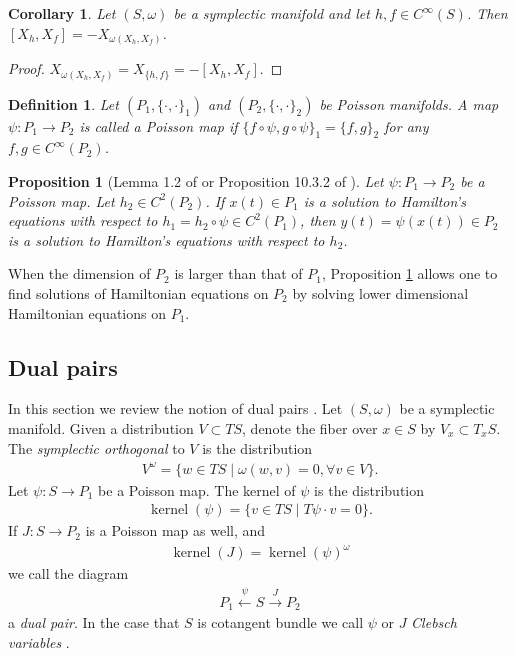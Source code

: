 \documentclass[12pt]{amsart}
\newtheorem{prop}[thm]{Proposition}
\newtheorem{cor}[thm]{Corollary}
\newtheorem{defn}[thm]{Definition}
\DeclareMathOperator{\kernel}{kernel}
\begin{document}
\begin{cor} \label{cor:Lie_hom}
  Let $(S,\omega)$ be a symplectic manifold
  and let $h,f \in C^{\infty}(S)$.
  Then $[X_h , X_f] = -X_{\omega(X_h,X_f) }$.
\end{cor}
\begin{proof}
  $X_{\omega(X_h,X_f)} = X_{ \{h,f\} } = -[X_h , X_f]$.
\end{proof}

\begin{defn}
  Let $(P_1, \{ \cdot , \cdot \}_1)$ and $(P_2, \{ \cdot , \cdot \}_2)$
  be Poisson manifolds.
  A map $\psi:P_1 \to P_2$ is called a
  \emph{Poisson map} if $\{ f \circ \psi , g \circ \psi \}_1 = \{ f , g \}_2$  for any $f,g \in C^{\infty}(P_2)$.
\end{defn}


\begin{prop}[Lemma 1.2 of \cite{Weinstein1983} or Proposition 10.3.2 of \cite{MandS}] \label{prop:Poisson_dynamics}
  Let $\psi:P_1 \to P_2$ be a Poisson map.
  Let $h_2 \in C^2(P_2)$.
  If $x(t) \in P_1$ is a solution to Hamilton's equations with respect
  to $h_1 = h_2 \circ \psi \in C^2(P_1)$, then $y(t) = \psi(x(t)) \in P_2$ is a solution
  to Hamilton's equations with respect to $h_2$.
\end{prop}

  When the dimension of $P_2$ is larger than that of $P_1$,
  Proposition \ref{prop:Poisson_dynamics} allows one to find solutions of
  Hamiltonian equations on $P_2$
  by solving lower dimensional Hamiltonian equations
  on $P_1$.
  \subsection{Dual pairs}
  In this section we review the notion of dual pairs
  \cite{MarsdenWeinstein1983,Weinstein1983,Gay-BalmazVizman2011}.
  Let $(S,\omega)$ be a symplectic manifold.
  Given a distribution $V \subset TS$, denote the fiber over 
  $x \in S$ by $V_x \subset T_x S$.
  The \emph{symplectic orthogonal} to $V$ is the distribution
  \begin{align*}
    V^\omega = \{ w \in TS \mid \omega( w , v ) = 0, \forall v \in V \}.
  \end{align*}
  Let $\psi:S \to P_1$ be a Poisson map.
  The kernel of $\psi$ is the distribution
  \begin{align*}
    \kernel(\psi) = \{ v \in TS \mid T\psi \cdot v  = 0 \}.
  \end{align*}
  If $J:S \to P_2$ is a Poisson map as well, and
  \begin{align*}
    \kernel(J) = \kernel(\psi)^\omega
  \end{align*}
  we call the diagram
  \begin{align*}
    P_1 \stackrel{\psi}{\leftarrow} S \stackrel{J}{\to} P_2
  \end{align*}
  a \emph{dual pair}.
  In the case that $S$ is cotangent bundle we call $\psi$ or $J$
  \emph{Clebsch variables} \cite{MarsdenWeinstein1983}.
\end{document}
